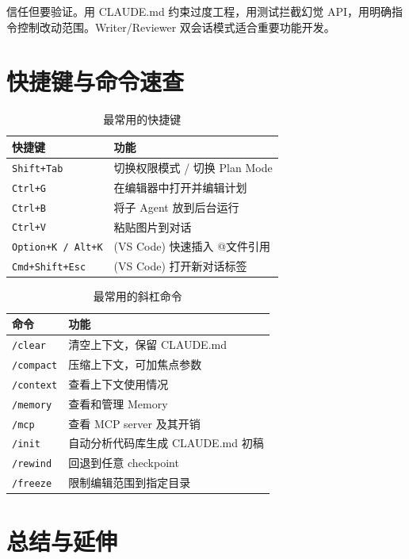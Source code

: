 \documentclass[a4paper]{article}
\begin{document}
信任但要验证。用 CLAUDE.md 约束过度工程，用测试拦截幻觉 API，用明确指令控制改动范围。Writer/Reviewer 双会话模式适合重要功能开发。

\section{快捷键与命令速查}

\begin{table}[H]
\centering
\caption{最常用的快捷键}
\begin{tabular}{ll}
\toprule
\textbf{快捷键} & \textbf{功能} \\
\midrule
\texttt{Shift+Tab} & 切换权限模式 / 切换 Plan Mode \\
\texttt{Ctrl+G} & 在编辑器中打开并编辑计划 \\
\texttt{Ctrl+B} & 将子 Agent 放到后台运行 \\
\texttt{Ctrl+V} & 粘贴图片到对话 \\
\texttt{Option+K / Alt+K} & (VS Code) 快速插入 @文件引用 \\
\texttt{Cmd+Shift+Esc} & (VS Code) 打开新对话标签 \\
\bottomrule
\end{tabular}
\end{table}

\begin{table}[H]
\centering
\caption{最常用的斜杠命令}
\begin{tabular}{ll}
\toprule
\textbf{命令} & \textbf{功能} \\
\midrule
\texttt{/clear} & 清空上下文，保留 CLAUDE.md \\
\texttt{/compact} & 压缩上下文，可加焦点参数 \\
\texttt{/context} & 查看上下文使用情况 \\
\texttt{/memory} & 查看和管理 Memory \\
\texttt{/mcp} & 查看 MCP server 及其开销 \\
\texttt{/init} & 自动分析代码库生成 CLAUDE.md 初稿 \\
\texttt{/rewind} & 回退到任意 checkpoint \\
\texttt{/freeze} & 限制编辑范围到指定目录 \\
\bottomrule
\end{tabular}
\end{table}

\section{总结与延伸}
\end{document}
